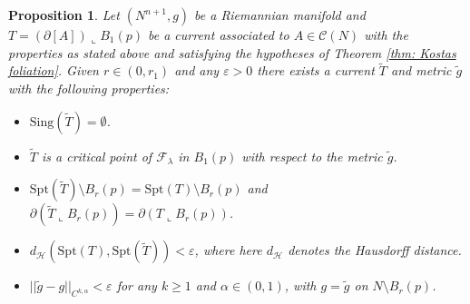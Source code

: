 \documentclass[11pt]{article}
\newtheorem{prop}{Proposition}
\begin{document}
\begin{prop}\label{prop: CMC surgery}
Let $(N^{n+1},g)$ be a Riemannian manifold and $T = (\partial [A]) \llcorner B_1(p)$ be a current associated to $A \in \mathcal{C}(N)$ with the properties as stated above and satisfying the hypotheses of Theorem \ref{thm: Kostas foliation}. Given $r \in (0,r_1)$ and any $\varepsilon > 0$ there exists a current $\tilde{T}$ and metric $\tilde{g}$ with the following properties:
\begin{itemize}
    \item $\mathrm{Sing}(\tilde{T}) = \emptyset$.

    \item $\tilde{T}$ is a critical point of $\mathcal{F}_\lambda$ in $B_1(p)$ with respect to the metric $\tilde{g}$.

    \item $\mathrm{Spt}(\tilde{T}) \setminus B_r(p) = \mathrm{Spt}(T) \setminus B_r(p)$ and $\partial( \tilde{T} \llcorner B_r(p)) = \partial (T \llcorner B_r(p))$.

    \item $d_{\mathcal{H}}(\mathrm{Spt}(T),\mathrm{Spt}(\tilde{T})) < \varepsilon$, where here $d_{\mathcal{H}}$ denotes the Hausdorff distance.
    
    \item $||\tilde{g} - g||_{C^{k,\alpha}} < \varepsilon$ for any $k \geq 1$ and $\alpha \in (0,1)$, with $g = \tilde{g}$ on $N \setminus B_r(p)$.
\end{itemize}
\end{prop}
\end{document}
